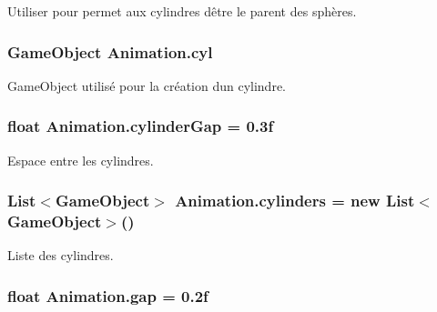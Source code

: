 Utiliser pour permet aux cylindres d\textquotesingle{}être le parent des sphères. 

\hypertarget{class_animation_adbb047fab7576bbef43eaf793cf090a6}{}
\subsubsection[{cyl}]{\setlength{\rightskip}{0pt plus 5cm}Game\+Object Animation.\+cyl\hspace{0.3cm}{\ttfamily [private]}}\label{class_animation_adbb047fab7576bbef43eaf793cf090a6}


Game\+Object utilisé pour la création d\textquotesingle{}un cylindre. 

\hypertarget{class_animation_a1e2704aeb83ffa433ed8e35f684fd39d}{}
\subsubsection[{cylinder\+Gap}]{\setlength{\rightskip}{0pt plus 5cm}float Animation.\+cylinder\+Gap = 0.\+3f\hspace{0.3cm}{\ttfamily [private]}}\label{class_animation_a1e2704aeb83ffa433ed8e35f684fd39d}


Espace entre les cylindres. 

\hypertarget{class_animation_a0d93aab7777651c0d98a8eb7c010dcf9}{}
\subsubsection[{cylinders}]{\setlength{\rightskip}{0pt plus 5cm}List$<$Game\+Object$>$ Animation.\+cylinders = new List$<$Game\+Object$>$()}\label{class_animation_a0d93aab7777651c0d98a8eb7c010dcf9}


Liste des cylindres. 

\hypertarget{class_animation_a9c85a94c8eab9de9fa561bde4bd5b93b}{}
\subsubsection[{gap}]{\setlength{\rightskip}{0pt plus 5cm}float Animation.\+gap = 0.\+2f\hspace{0.3cm}{\ttfamily [private]}}\label{class_animation_a9c85a94c8eab9de9fa561bde4bd5b93b}


